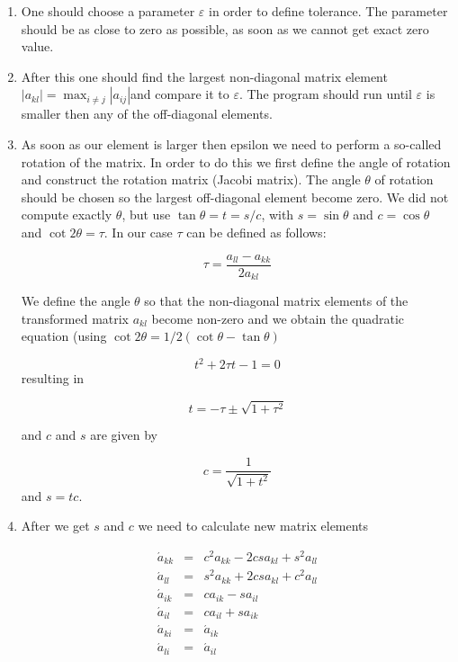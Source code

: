 \documentclass[10pt]{article}
\begin{document}
\begin{enumerate}
\item One should choose a parameter $\varepsilon $ in order to define tolerance. The parameter should be as close to zero as possible, as soon as we cannot get exact zero value.

\item After this one should find the largest non-diagonal matrix element $\left\vert
a_{kl}\right\vert =\max\nolimits_{i\neq j}\left\vert a_{ij}\right\vert $and
compare it to $\varepsilon $. The program should run until $\varepsilon $ is smaller then any of the off-diagonal elements.

\item As soon as our element is larger then epsilon we need to perform a so-called rotation of the matrix. In order to do this we first define the angle of rotation and construct the rotation matrix (Jacobi matrix). The angle $\theta $ of rotation should be chosen so the largest off-diagonal element become zero.
We did not compute exactly $\theta $, but use $%
\tan \theta =t=s/c$, with $s=\sin \theta $ and $c=\cos \theta $ and $\cot
2\theta =\tau $. 
In our case $\tau $ can be defined as follows:

\begin{equation}
\tau =\frac{a_{ll}-a_{kk}}{2a_{kl}}
\end{equation}%

We define the angle $\theta $ so that the non-diagonal matrix
elements of the transformed matrix $a_{kl}$ become non-zero and we obtain
the quadratic equation (using $\cot 2\theta =1/2(\cot \theta -\tan \theta )$

\begin{equation}
t^{2}+2\tau t-1=0
\end{equation}
resulting in

\begin{equation}
t=-\tau \pm \sqrt{1+\tau ^{2}}
\end{equation}

and $c$ and $s$ are given by

\begin{equation}
c=\frac{1}{\sqrt{1+t^{2}}}
\end{equation}
and $s=tc$. 

\item 
After we get $s$ and $c$ we need to calculate new matrix elements



\begin{eqnarray}
\acute{a}_{kk} &=&c^{2}a_{kk}-2csa_{kl}+s^{2}a_{ll} \\
\acute{a}_{ll} &=&s^{2}a_{kk}+2csa_{kl}+c^{2}a_{ll} \\
\acute{a}_{ik} &=&ca_{ik}-sa_{il} \\
\acute{a}_{il} &=&ca_{il}+sa_{ik} \\
\acute{a}_{ki} &=&\acute{a}_{ik} \\
\acute{a}_{li} &=&\acute{a}_{il}
\end{eqnarray}


\end{enumerate}
\end{document}
